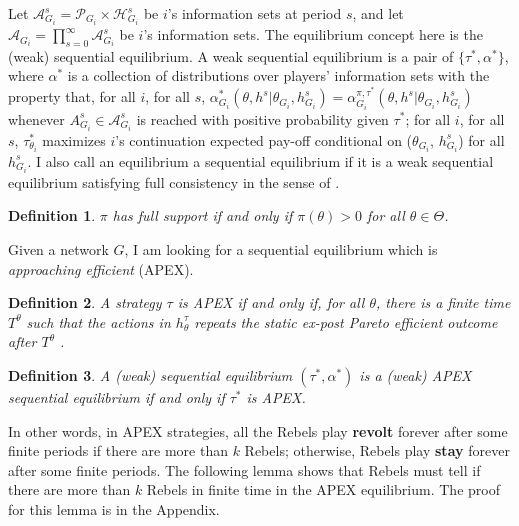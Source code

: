 \documentclass[12pt,letterpaper]{article}
\newtheorem*{main result}{Main Result}
\newtheorem{definition}{Definition}[section]
\theoremstyle{definition}
\theoremstyle{remark}
\theoremstyle{claim}
\begin{document}
Let $\mathcal{A}^s_{G_i}=\mathcal{P}_{G_i}\times \mathcal{H}^s_{G_i}$ be $i$'s information sets at period $s$, and let $\mathcal{A}_{G_i}=\prod^{\infty}_{s=0}\mathcal{A}^s_{G_i}$ be $i$'s information sets. The equilibrium concept here is the (weak) sequential equilibrium. A weak sequential equilibrium is a pair of $\{\tau^{*}, \alpha^{*}\}$, where $\alpha^{*}$ is a collection of distributions over players' information sets with the property that, for all $i$, for all $s$, $\alpha^{*}_{G_i}(\theta, h^{s}|\theta_{G_i},h^{s}_{G_i})=\alpha^{\pi,\tau^{*}}_{G_i}(\theta, h^{s}|\theta_{G_i},h^{s}_{G_i})$ whenever $A^s_{G_i}\in \mathcal{A}^{s}_{G_i}$ is reached with positive probability given $\tau^{*}$; for all $i$, for all $s$, $\tau^{*}_{\theta_i}$ maximizes $i$'s continuation expected pay-off conditional on ($\theta_{G_i}$, $h^{s}_{G_i}$) for all $h^{s}_{G_i}$. I also call an equilibrium a sequential equilibrium if it is a weak sequential equilibrium satisfying full consistency in the sense of \citep{Krep_Wilson1982}.

\begin{definition}
$\pi$ has full support if and only if $\pi(\theta)>0$ for all $\theta\in \Theta$.
\end{definition}

Given a network $G$, I am looking for a sequential equilibrium which is \textit{approaching efficient} (APEX). 

\begin{definition}
A strategy $\tau$ is APEX  if and only if, for all $\theta$, there is a finite time $T^{\theta}$ such that the actions in $h^{\tau}_{\theta}$ repeats the static ex-post Pareto efficient outcome after $T^{\theta}$ .
\end{definition}

\begin{definition}\label{Def_expost_efficient}
A (weak) sequential equilibrium $(\tau^{*},\alpha^{*})$ is a (weak) APEX sequential equilibrium if and only if $\tau^{*}$ is APEX.
\end{definition}

In other words, in APEX strategies, all the Rebels play \textbf{revolt} forever after some finite periods if there are more than $k$ Rebels; otherwise, Rebels play \textbf{stay} forever after some finite periods. The following lemma shows that Rebels must tell if there are more than $k$ Rebels in finite time in the APEX equilibrium. The proof for this lemma is in the Appendix.
\end{document}
